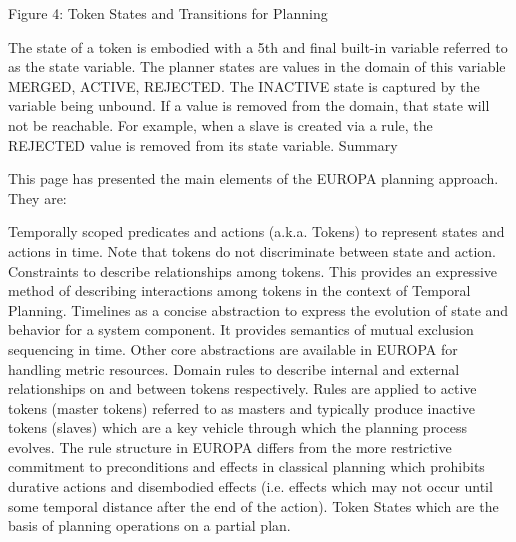 Figure 4: Token States and Transitions for Planning

The state of a token is embodied with a 5th and final built-in variable referred to as the state variable. The planner states are values in the domain of this variable {MERGED, ACTIVE, REJECTED}. The INACTIVE state is captured by the variable being unbound. If a value is removed from the domain, that state will not be reachable. For example, when a slave is created via a rule, the REJECTED value is removed from its state variable.
Summary

This page has presented the main elements of the EUROPA planning approach. They are:

    Temporally scoped predicates and actions (a.k.a. Tokens) to represent states and actions in time. Note that tokens do not discriminate between state and action.
    Constraints to describe relationships among tokens. This provides an expressive method of describing interactions among tokens in the context of Temporal Planning.
    Timelines as a concise abstraction to express the evolution of state and behavior for a system component. It provides semantics of mutual exclusion sequencing in time. Other core abstractions are available in EUROPA for handling metric resources.
    Domain rules to describe internal and external relationships on and between tokens respectively. Rules are applied to active tokens (master tokens) referred to as masters and typically produce inactive tokens (slaves) which are a key vehicle through which the planning process evolves. The rule structure in EUROPA differs from the more restrictive commitment to preconditions and effects in classical planning which prohibits durative actions and disembodied effects (i.e. effects which may not occur until some temporal distance after the end of the action).
    Token States which are the basis of planning operations on a partial plan. 
